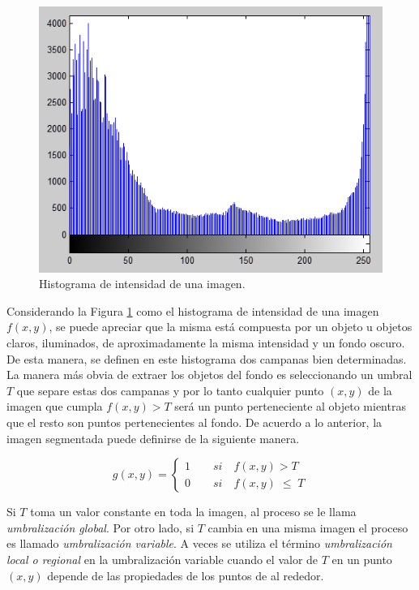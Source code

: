 \begin{figure}[ht!]
\begin{center}
\includegraphics[scale=0.7]{img/otsu2.png}
\end{center}
\vspace{-0.5cm}
\caption{Histograma de intensidad de una imagen.} 
\label{otsuFruta}
\end{figure}


Considerando la Figura \ref{otsuFruta} como el histograma de intensidad de una imagen $f(x,y)$, se puede apreciar que la misma está compuesta por un objeto u objetos claros, iluminados, de aproximadamente la misma intensidad y un fondo oscuro. De esta manera, se definen en este histograma dos campanas bien determinadas. La manera más obvia de extraer los objetos del fondo es seleccionando un umbral $T$ que separe estas dos campanas y por lo tanto cualquier punto $(x,y)$ de la imagen que cumpla $f(x,y) > T$ será un punto perteneciente al objeto mientras que el resto son puntos pertenecientes al fondo. De acuerdo a lo anterior, la imagen segmentada puede definirse de la siguiente manera.

\begin{equation}
g(x,y) = \left\{
\begin{array}{l}
\displaystyle 1{\qquad}si{\quad}f(x,y) > T\\
\displaystyle 0{\qquad}si{\quad}f(x,y)\;{\leq}\;T
\end{array} 
\right.
\label{eq:xdef}
\end{equation}

Si $T$ toma un valor constante en toda la imagen, al proceso se le llama \textit{umbralización global}. Por otro lado, si $T$ cambia en una misma imagen el proceso es llamado \textit{umbralización variable}. A veces se utiliza el término \textit{umbralización local o regional} en la umbralización variable cuando el valor de $T$ en un punto $(x,y)$ depende de las propiedades de los puntos de al rededor.

